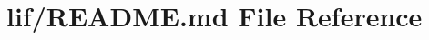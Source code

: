 \hypertarget{lif_2README_8md}{}\section{lif/\+R\+E\+A\+D\+ME.md File Reference}
\label{lif_2README_8md}
